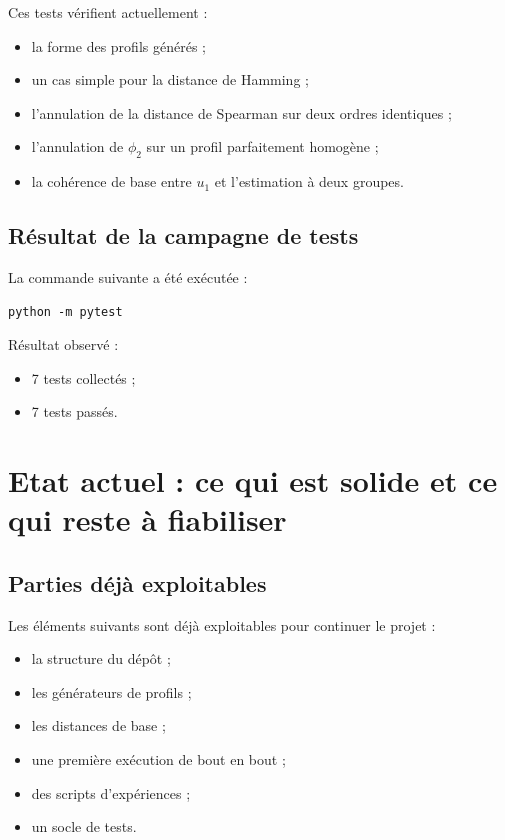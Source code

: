 \documentclass[11pt,a4paper]{article}
\begin{document}
Ces tests v\'erifient actuellement :
\begin{itemize}[leftmargin=*]
    \item la forme des profils g\'en\'er\'es ;
    \item un cas simple pour la distance de Hamming ;
    \item l'annulation de la distance de Spearman sur deux ordres identiques ;
    \item l'annulation de \(\phi_2\) sur un profil parfaitement homog\`ene ;
    \item la coh\'erence de base entre \(u_1\) et l'estimation \`a deux groupes.
\end{itemize}

\subsection{R\'esultat de la campagne de tests}

La commande suivante a \'et\'e ex\'ecut\'ee :

\begin{lstlisting}
python -m pytest
\end{lstlisting}

R\'esultat observ\'e :
\begin{itemize}[leftmargin=*]
    \item 7 tests collect\'es ;
    \item 7 tests pass\'es.
\end{itemize}

\section{Etat actuel : ce qui est solide et ce qui reste \`a fiabiliser}

\subsection{Parties d\'ej\`a exploitables}

Les \'el\'ements suivants sont d\'ej\`a exploitables pour continuer le projet :
\begin{itemize}[leftmargin=*]
    \item la structure du d\'ep\^ot ;
    \item les g\'en\'erateurs de profils ;
    \item les distances de base ;
    \item une premi\`ere ex\'ecution de bout en bout ;
    \item des scripts d'exp\'eriences ;
    \item un socle de tests.
\end{itemize}
\end{document}
